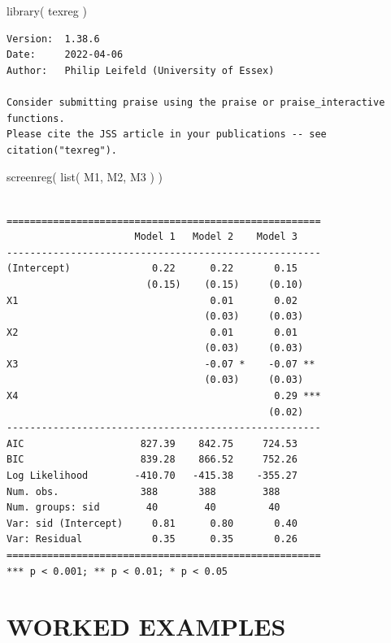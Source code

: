 \documentclass[
  letterpaper,
  DIV=11,
  numbers=noendperiod]{scrreprt}
\newenvironment{Shaded}{\begin{snugshade}}{\end{snugshade}}
\newcommand{\FunctionTok}[1]{\textcolor[rgb]{0.02,0.16,0.49}{#1}}
\newcommand{\NormalTok}[1]{\textcolor[rgb]{0.00,0.44,0.13}{#1}}
\begin{document}
\begin{Shaded}
\begin{Highlighting}[]
\FunctionTok{library}\NormalTok{( texreg )}
\end{Highlighting}
\end{Shaded}

\begin{verbatim}
Version:  1.38.6
Date:     2022-04-06
Author:   Philip Leifeld (University of Essex)

Consider submitting praise using the praise or praise_interactive functions.
Please cite the JSS article in your publications -- see citation("texreg").
\end{verbatim}

\begin{Shaded}
\begin{Highlighting}[]
\FunctionTok{screenreg}\NormalTok{( }\FunctionTok{list}\NormalTok{( M1, M2, M3 ) )}
\end{Highlighting}
\end{Shaded}

\begin{verbatim}

======================================================
                      Model 1   Model 2    Model 3    
------------------------------------------------------
(Intercept)              0.22      0.22       0.15    
                        (0.15)    (0.15)     (0.10)   
X1                                 0.01       0.02    
                                  (0.03)     (0.03)   
X2                                 0.01       0.01    
                                  (0.03)     (0.03)   
X3                                -0.07 *    -0.07 ** 
                                  (0.03)     (0.03)   
X4                                            0.29 ***
                                             (0.02)   
------------------------------------------------------
AIC                    827.39    842.75     724.53    
BIC                    839.28    866.52     752.26    
Log Likelihood        -410.70   -415.38    -355.27    
Num. obs.              388       388        388       
Num. groups: sid        40        40         40       
Var: sid (Intercept)     0.81      0.80       0.40    
Var: Residual            0.35      0.35       0.26    
======================================================
*** p < 0.001; ** p < 0.01; * p < 0.05
\end{verbatim}

\part{WORKED EXAMPLES}
\end{document}
